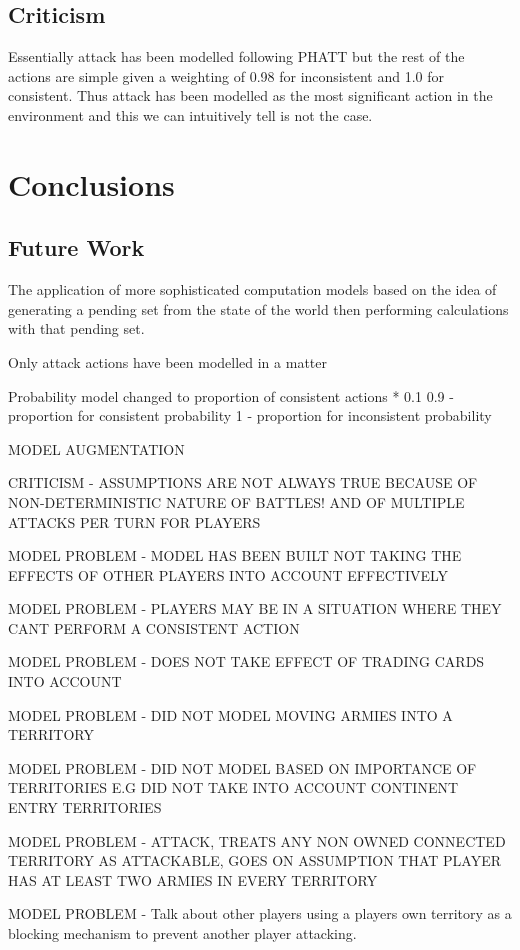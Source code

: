 \documentclass[parskip]{cs4rep}
\begin{document}
\section{Criticism}

Essentially attack has been modelled following PHATT but the rest of the actions are simple given a weighting of 0.98 for inconsistent and 1.0 for consistent. Thus attack has been modelled as the most significant action in the environment and this we can intuitively tell is not the case.

\chapter{Conclusions}

\section{Future Work}

The application of more sophisticated computation models based on the idea of generating a pending set from the state of the world then performing calculations with that pending set.

Only attack actions have been modelled in a matter 

Probability model changed to proportion of consistent actions * 0.1 
0.9 - proportion for consistent probability
1 - proportion for inconsistent probability

MODEL AUGMENTATION

CRITICISM - ASSUMPTIONS ARE NOT ALWAYS TRUE BECAUSE OF NON-DETERMINISTIC NATURE OF BATTLES! AND OF MULTIPLE ATTACKS PER TURN FOR PLAYERS

MODEL PROBLEM - MODEL HAS BEEN BUILT NOT TAKING THE EFFECTS OF OTHER PLAYERS INTO ACCOUNT EFFECTIVELY

MODEL PROBLEM - PLAYERS MAY BE IN A SITUATION WHERE THEY CANT PERFORM A CONSISTENT ACTION

MODEL PROBLEM - DOES NOT TAKE EFFECT OF TRADING CARDS INTO ACCOUNT

MODEL PROBLEM - DID NOT MODEL MOVING ARMIES INTO A TERRITORY

MODEL PROBLEM - DID NOT MODEL BASED ON IMPORTANCE OF TERRITORIES E.G DID NOT TAKE INTO ACCOUNT CONTINENT ENTRY TERRITORIES

MODEL PROBLEM - ATTACK, TREATS ANY NON OWNED CONNECTED TERRITORY AS ATTACKABLE, GOES ON ASSUMPTION THAT PLAYER HAS AT LEAST TWO ARMIES IN EVERY TERRITORY

MODEL PROBLEM - Talk about other players using a players own territory as a blocking mechanism to prevent another player attacking.
\end{document}
